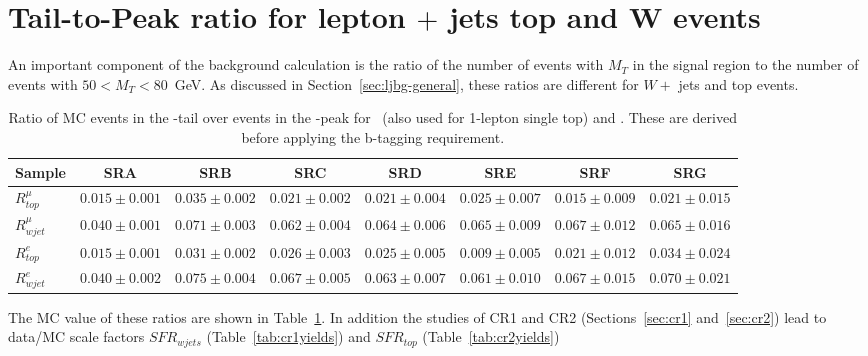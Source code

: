 \section{Tail-to-Peak ratio for lepton $+$ jets top and W events}
\label{sec:ttp}

An important component
of the background calculation is the ratio of the number of events with $M_T$ in the signal region
to the number of events with $50 < M_T < 80$~GeV.  
As discussed in Section~\ref{sec:ljbg-general}, these ratios are different for $W +$ jets and 
top events.  



\begin{table}[!h]
\begin{center}
{\footnotesize
\begin{tabular}{l||c|c|c|c|c|c|c}
\hline
Sample              & SRA & SRB & SRC & SRD & SRE & SRF & SRG\\
\hline
\hline
$R^{\mu}_{top}$ 	  & $0.015 \pm 0.001$  & $0.035 \pm 0.002$  & $0.021 \pm 0.002$  & $0.021 \pm 0.004$  & $0.025 \pm 0.007$  & $0.015 \pm 0.009$  & $0.021 \pm 0.015$  \\
$R^{\mu}_{wjet}$ 	  & $0.040 \pm 0.001$  & $0.071 \pm 0.003$  & $0.062 \pm 0.004$  & $0.064 \pm 0.006$  & $0.065 \pm 0.009$  & $0.067 \pm 0.012$  & $0.065 \pm 0.016$  \\
\hline
\hline
$R^e_{top}$ 	  & $0.015 \pm 0.001$  & $0.031 \pm 0.002$  & $0.026 \pm 0.003$  & $0.025 \pm 0.005$  & $0.009 \pm 0.005$  & $0.021 \pm 0.012$  & $0.034 \pm 0.024$  \\
$R^e_{wjet}$ 	  & $0.040 \pm 0.002$  & $0.075 \pm 0.004$  & $0.067 \pm 0.005$  & $0.063 \pm 0.007$  & $0.061 \pm 0.010$  & $0.067 \pm 0.015$  & $0.070 \pm 0.021$  \\
\hline
\end{tabular}}
\caption{ Ratio of MC events in the \mt-tail over events in the \mt-peak for
  \ttsl\ (also used for 1-lepton single top) and \wjets. These are
  derived before applying the b-tagging requirement.  
\label{tab:ttp}}
\end{center}
\end{table}

The MC value of these ratios are shown in Table~\ref{tab:ttp}.
In addition the studies of CR1 and CR2 (Sections~\ref{sec:cr1} and~\ref{sec:cr2})
lead to data/MC scale factors 
$SFR_{wjets}$ (Table~\ref{tab:cr1yields}) and
$SFR_{top}$  (Table~\ref{tab:cr2yields})

\clearpage